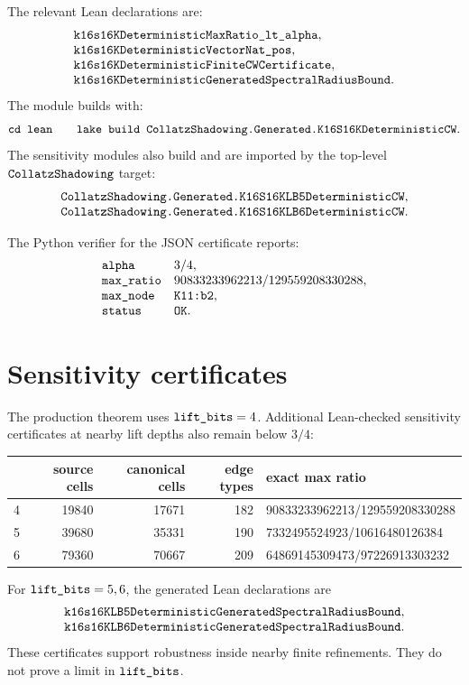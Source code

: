 \documentclass[11pt,a4paper]{article}
\newcommand{\ttbr}[1]{\ifmmode\text{\texttt{\detokenize{#1}}}\else\texttt{\detokenize{#1}}\fi}
\begin{document}
The relevant Lean declarations are:
\[
\begin{array}{l}
\ttbr{k16s16KDeterministicMaxRatio_lt_alpha},\\
\ttbr{k16s16KDeterministicVectorNat_pos},\\
\ttbr{k16s16KDeterministicFiniteCWCertificate},\\
\ttbr{k16s16KDeterministicGeneratedSpectralRadiusBound}.
\end{array}
\]
The module builds with:
\[
\ttbr{cd lean}
\qquad
\ttbr{lake build CollatzShadowing.Generated.K16S16KDeterministicCW}.
\]
The sensitivity modules also build and are imported by the top-level
\(\ttbr{CollatzShadowing}\) target:
\[
\begin{array}{l}
\ttbr{CollatzShadowing.Generated.K16S16KLB5DeterministicCW},\\
\ttbr{CollatzShadowing.Generated.K16S16KLB6DeterministicCW}.
\end{array}
\]

The Python verifier for the JSON certificate reports:
\[
\begin{array}{ll}
\ttbr{alpha} & 3/4,\\
\ttbr{max_ratio} & 90833233962213/129559208330288,\\
\ttbr{max_node} & \ttbr{K11:b2},\\
\ttbr{status} & \ttbr{OK}.
\end{array}
\]

\section{Sensitivity certificates}

The production theorem uses \(\ttbr{lift_bits}=4\).  Additional
Lean-checked sensitivity certificates at nearby lift depths also remain
below \(3/4\):
\begin{center}
\begin{tabular}{rrrrp{}}
\hline
\ttbr{lift_bits} & source cells & canonical cells
& edge types & exact max ratio\\
\hline
4 & 19840 & 17671 & 182
& 90833233962213/129559208330288\\
5 & 39680 & 35331 & 190
& 7332495524923/10616480126384\\
6 & 79360 & 70667 & 209
& 64869145309473/97226913303232\\
\hline
\end{tabular}
\end{center}
For \(\ttbr{lift_bits}=5,6\), the generated Lean declarations are
\[
\begin{array}{l}
\ttbr{k16s16KLB5DeterministicGeneratedSpectralRadiusBound},\\
\ttbr{k16s16KLB6DeterministicGeneratedSpectralRadiusBound}.
\end{array}
\]
These certificates support robustness inside nearby finite refinements.
They do not prove a limit in \(\ttbr{lift_bits}\).
\end{document}
